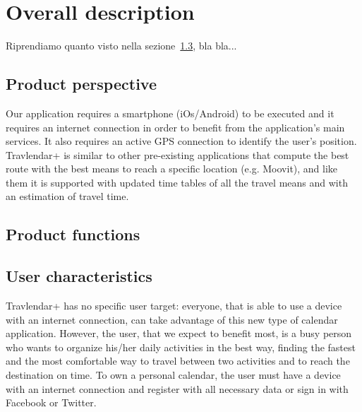 \documentclass[12pt,titlepage]{article}
\begin{document}
\section{Overall description}\label{sec:crit}

Riprendiamo quanto visto nella sezione~\ref{sec:mod1}, bla bla...
\subsection{Product perspective}\label{sec:mod1}
Our application requires a smartphone (iOs/Android) to be executed and it requires an internet connection in order to benefit from the application's main services.
It also requires an active GPS connection to identify the user's position. 
Travlendar+ is similar to other pre-existing applications that compute the best route with the best means to reach a specific location (e.g. Moovit), and like them it is supported with updated time tables of all the travel means and with an estimation of travel time. 


\subsection{Product functions}\label{sec:mod1}
\subsection{User characteristics}\label{sec:mod1}
Travlendar+ has no specific user target: everyone, that is able to use a device with an internet connection, can take advantage of this new type of calendar application.
However, the user, that we expect to benefit most, is a busy person who wants to organize his/her daily activities in the best way, finding the fastest and the most comfortable way to travel between two activities and to reach the destination on time.
To own a personal calendar, the user must have a device with an internet connection and register with all necessary data or sign in with Facebook or Twitter.
\end{document}
